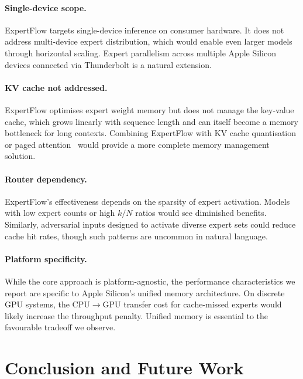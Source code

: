 \documentclass[11pt,a4paper]{article}
\begin{document}
\paragraph{Single-device scope.} ExpertFlow targets single-device inference on
consumer hardware. It does not address multi-device expert distribution, which
would enable even larger models through horizontal scaling. Expert
parallelism across multiple Apple Silicon devices connected via Thunderbolt is
a natural extension.

\paragraph{KV cache not addressed.} ExpertFlow optimises expert weight memory
but does not manage the key-value cache, which grows linearly with sequence
length and can itself become a memory bottleneck for long contexts. Combining
ExpertFlow with KV cache quantisation or paged
attention~\citep{kwon2023pagedattention} would provide a more complete memory
management solution.

\paragraph{Router dependency.} ExpertFlow's effectiveness depends on the
sparsity of expert activation. Models with low expert counts or high $k/N$
ratios would see diminished benefits. Similarly, adversarial inputs designed to
activate diverse expert sets could reduce cache hit rates, though such patterns
are uncommon in natural language.

\paragraph{Platform specificity.} While the core approach is
platform-agnostic, the performance characteristics we report are specific to
Apple Silicon's unified memory architecture. On discrete GPU systems, the
CPU$\rightarrow$GPU transfer cost for cache-missed experts would likely
increase the throughput penalty. Unified memory is essential to the
favourable tradeoff we observe.

\section{Conclusion and Future Work}
\label{sec:conclusion}
\end{document}

